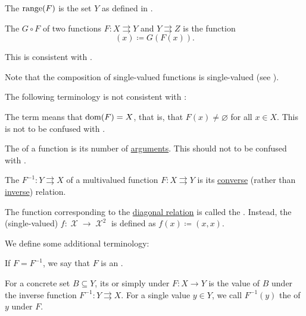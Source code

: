 \begin{definition}
\begin{thmenum}[resume=def:function]
     The  \( \operatorname{range}(F) \) is the set \( Y \) as defined in .

     The  \( G \circ F \) of two functions \( F: X \rightrightarrows Y \) and \( Y \rightrightarrows Z \) is the function
    \begin{equation*}
      [G \circ F](x) \coloneqq G(F(x)).
    \end{equation*}

    This is consistent with .

    Note that the composition of single-valued functions is single-valued (see ).
  \end{thmenum}

  The following terminology is not consistent with :
  \begin{thmenum}[resume=def:function]
     The term  means that \( \operatorname{dom}(F) = X \), that is, that \( F(x) \neq \varnothing \) for all \( x \in X \). This is not to be confused with .

     The  of a function is its number of \hyperref[def:function/arity]{arguments}. This should not to be confused with .

     The  \( F^{-1}: Y \rightrightarrows X \) of a multivalued function \( F: X \rightrightarrows Y \) is its \hyperref[def:binary_relation/converse]{converse} (rather than \hyperref[def:binary_relation/inverse]{inverse}) relation.

     The function corresponding to the \hyperref[def:binary_relation/diagonal]{diagonal relation} is called the . Instead, the (single-valued)  \( f: \mscrX \to \mscrX^2 \) is defined as \( f(x) \coloneqq (x, x) \).
  \end{thmenum}

  We define some additional terminology:
  \begin{thmenum}[resume=def:function]
     If \( F = F^{-1} \), we say that \( F \) is an .

     For a concrete set \( B \subseteq Y \), its  or simply  under \( F: X \to Y \) is the value of \( B \) under the inverse function \( F^{-1}: Y \rightrightarrows X \). For a single value \( y \in Y \), we call \( F^{-1}(y) \) the  of \( y \) under \( F \).


\end{thmenum}
\end{definition}
